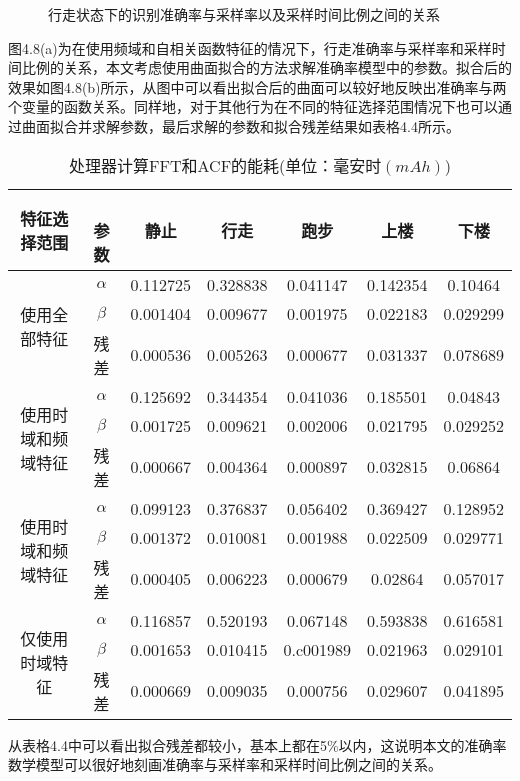 \begin{figure}[!htb]
    \centering
    \caption{行走状态下的识别准确率与采样率以及采样时间比例之间的关系}
\end{figure}

\par 图4.8(a)为在使用频域和自相关函数特征的情况下，行走准确率与采样率和采样时间比例的关系，本文考虑使用曲面拟合的方法求解准确率模型中的参数。拟合后的效果如图4.8(b)所示，从图中可以看出拟合后的曲面可以较好地反映出准确率与两个变量的函数关系。同样地，对于其他行为在不同的特征选择范围情况下也可以通过曲面拟合并求解参数，最后求解的参数和拟合残差结果如表格4.4所示。

\begin{table}[htb]
    \centering
    \caption{处理器计算FFT和ACF的能耗(单位：毫安时$(mAh)$)}
    \begin{tabular}{ccccccc}
    \toprule
    特征选择范围 & 　参数 & 静止 & 行走 & 跑步 & 上楼 & 下楼\\
    \midrule
    \multirow{3}{2cm}{使用全部特征} & $\alpha$ & 0.112725 & 0.328838 & 0.041147 & 0.142354 & 0.10464 \\
    & $\beta$ & 0.001404 & 0.009677 & 0.001975 & 0.022183 & 0.029299 \\
    & 残差 & 0.000536 & 0.005263 & 0.000677 & 0.031337 & 0.078689 \\
    \midrule
    \multirow{3}{2cm}{使用时域和频域特征} & $\alpha$ & 0.125692 & 0.344354 & 0.041036 & 0.185501 & 0.04843 \\
    & $\beta$ & 0.001725 & 0.009621 & 0.002006 & 0.021795 & 0.029252 \\
    & 残差 & 0.000667 & 0.004364 & 0.000897 & 0.032815 & 0.06864 \\ 
    \midrule
    \multirow{3}{2cm}{使用时域和频域特征} & $\alpha$ & 0.099123 & 0.376837 & 0.056402 & 0.369427 & 0.128952 \\
    & $\beta$ & 0.001372 & 0.010081 & 0.001988 & 0.022509 & 0.029771 \\
    & 残差 & 0.000405 & 0.006223 & 0.000679 & 0.02864 & 0.057017 \\ 
    \midrule
    \multirow{3}{2cm}{仅使用时域特征}  & $\alpha$ & 0.116857 & 0.520193 & 0.067148 & 0.593838 & 0.616581 \\  
    & $\beta$ & 0.001653 & 0.010415 & 0.c001989 & 0.021963 & 0.029101 \\  
    & 残差 & 0.000669 & 0.009035 & 0.000756 & 0.029607 & 0.041895 \\
    \bottomrule
    \end{tabular}
\end{table}
\par 从表格4.4中可以看出拟合残差都较小，基本上都在5\%以内，这说明本文的准确率数学模型可以很好地刻画准确率与采样率和采样时间比例之间的关系。

